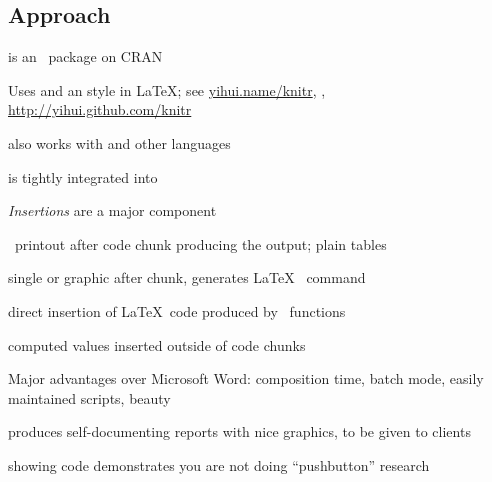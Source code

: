 \subsection{ Approach}
\bi
\item {} is an \R\ package on CRAN
\item Uses  and an  style in \LaTeX; see
\url{yihui.name/knitr}, \cite{knitrbook}, \url{http://yihui.github.com/knitr}
\item {} also works with  and other languages
\item {} is tightly integrated into 
\item \emph{Insertions} are a major component
 \bi
 \item \R\ printout after code chunk producing the output; plain tables
 \item single  or  graphic after chunk,
 generates \LaTeX\  command
 \item direct insertion of \LaTeX\ code produced by \R\ functions
 \item computed values inserted outside of code chunks
 \ei
\item Major advantages over Microsoft Word: composition time, batch
 mode, easily maintained scripts, beauty
\item {} produces self-documenting reports with nice graphics,
to be given to clients
 \bi
 \item showing code demonstrates you are not doing ``pushbutton'' research
 \ei
\ei

